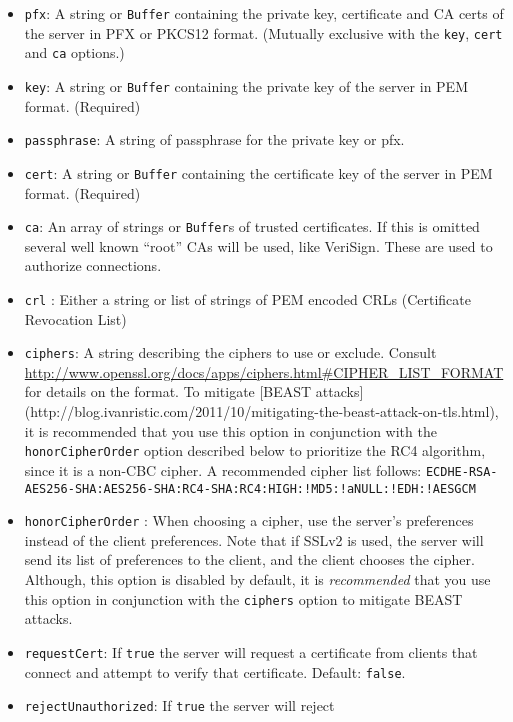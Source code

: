 \begin{itemize}
\item
  \texttt{pfx}: A string or \texttt{Buffer} containing the private key,
  certificate and CA certs of the server in PFX or PKCS12 format.
  (Mutually exclusive with the \texttt{key}, \texttt{cert} and
  \texttt{ca} options.)
\item
  \texttt{key}: A string or \texttt{Buffer} containing the private key
  of the server in PEM format. (Required)
\item
  \texttt{passphrase}: A string of passphrase for the private key or
  pfx.
\item
  \texttt{cert}: A string or \texttt{Buffer} containing the certificate
  key of the server in PEM format. (Required)
\item
  \texttt{ca}: An array of strings or \texttt{Buffer}s of trusted
  certificates. If this is omitted several well known ``root'' CAs will
  be used, like VeriSign. These are used to authorize connections.
\item
  \texttt{crl} : Either a string or list of strings of PEM encoded CRLs
  (Certificate Revocation List)
\item
  \texttt{ciphers}: A string describing the ciphers to use or exclude.
  Consult
  \url{http://www.openssl.org/docs/apps/ciphers.html#CIPHER_LIST_FORMAT}
  for details on the format. To mitigate {[}BEAST attacks{]}
  (http://blog.ivanristic.com/2011/10/mitigating-the-beast-attack-on-tls.html),
  it is recommended that you use this option in conjunction with the
  \texttt{honorCipherOrder} option described below to prioritize the RC4
  algorithm, since it is a non-CBC cipher. A recommended cipher list
  follows:
  \texttt{ECDHE-RSA-AES256-SHA:AES256-SHA:RC4-SHA:RC4:HIGH:!MD5:!aNULL:!EDH:!AESGCM}
\item
  \texttt{honorCipherOrder} : When choosing a cipher, use the server's
  preferences instead of the client preferences. Note that if SSLv2 is
  used, the server will send its list of preferences to the client, and
  the client chooses the cipher. Although, this option is disabled by
  default, it is \emph{recommended} that you use this option in
  conjunction with the \texttt{ciphers} option to mitigate BEAST
  attacks.
\item
  \texttt{requestCert}: If \texttt{true} the server will request a
  certificate from clients that connect and attempt to verify that
  certificate. Default: \texttt{false}.
\item
  \texttt{rejectUnauthorized}: If \texttt{true} the server will reject

\end{itemize}
